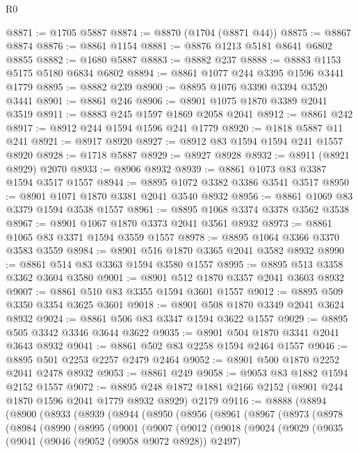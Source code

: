 \begin{lexlean}{R0}
\begin{coremodule}
@8871 := @1705 @5887
@8874 := @8870 (@1704 (@8871 @44))
@8875 := @8867 @8874
@8876 := @8861 @1154
@8881 := @8876 @1213 @5181 @8641 @6802 @8855
@8882 := @1680 @5887
@8883 := @8882 @237
@8888 := @8883 @1153 @5175 @5180 @6834 @6802
@8894 := @8861 @1077 @244 @3395 @1596 @3441 @1779
@8895 := @8882 @239
@8900 := @8895 @1076 @3390 @3394 @3520 @3441
@8901 := @8861 @246
@8906 := @8901 @1075 @1870 @3389 @2041 @3519
@8911 := @8883 @245 @1597 @1869 @2058 @2041
@8912 := @8861 @242
@8917 := @8912 @244 @1594 @1596 @241 @1779
@8920 := @1818 @5887 @11 @241
@8921 := @8917 @8920
@8927 := @8912 @83 @1594 @1594 @241 @1557 @8920
@8928 := @1718 @5887
@8929 := @8927 @8928
@8932 := @8911 (@8921 @8929) @2070
@8933 := @8906 @8932
@8939 := @8861 @1073 @83 @3387 @1594 @3517 @1557
@8944 := @8895 @1072 @3382 @3386 @3541 @3517
@8950 := @8901 @1071 @1870 @3381 @2041 @3540 @8932
@8956 := @8861 @1069 @83 @3379 @1594 @3538 @1557
@8961 := @8895 @1068 @3374 @3378 @3562 @3538
@8967 := @8901 @1067 @1870 @3373 @2041 @3561 @8932
@8973 := @8861 @1065 @83 @3371 @1594 @3559 @1557
@8978 := @8895 @1064 @3366 @3370 @3583 @3559
@8984 := @8901 @516 @1870 @3365 @2041 @3582 @8932
@8990 := @8861 @514 @83 @3363 @1594 @3580 @1557
@8995 := @8895 @513 @3358 @3362 @3604 @3580
@9001 := @8901 @512 @1870 @3357 @2041 @3603 @8932
@9007 := @8861 @510 @83 @3355 @1594 @3601 @1557
@9012 := @8895 @509 @3350 @3354 @3625 @3601
@9018 := @8901 @508 @1870 @3349 @2041 @3624 @8932
@9024 := @8861 @506 @83 @3347 @1594 @3622 @1557
@9029 := @8895 @505 @3342 @3346 @3644 @3622
@9035 := @8901 @504 @1870 @3341 @2041 @3643 @8932
@9041 := @8861 @502 @83 @2258 @1594 @2464 @1557
@9046 := @8895 @501 @2253 @2257 @2479 @2464
@9052 := @8901 @500 @1870 @2252 @2041 @2478 @8932
@9053 := @8861 @249
@9058 := @9053 @83 @1882 @1594 @2152 @1557
@9072 := @8895 @248 @1872 @1881 @2166 @2152 (@8901 @244 @1870 @1596 @2041 @1779 @8932 @8929) @2179
@9116 := @8888
    (@8894
      (@8900
        (@8933
          (@8939
            (@8944
              (@8950
                (@8956
                  (@8961
                    (@8967
                      (@8973
                        (@8978
                          (@8984
                            (@8990
                              (@8995
                                (@9001
                                  (@9007
                                    (@9012
                                      (@9018
                                        (@9024
                                          (@9029
                                            (@9035
                                              (@9041
                                                (@9046 (@9052 (@9058 @9072 @8928)) @2497)

\end{coremodule}
\end{lexlean}

